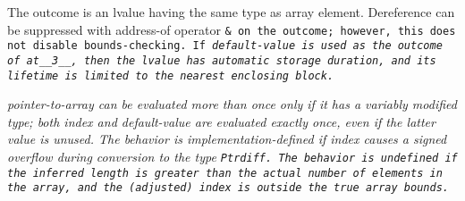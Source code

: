 The outcome is an lvalue having the same type as array element.
Dereference can be suppressed with address-of operator \tt{&}
on the outcome; however, this does not disable bounds-checking.
If \it{default-value} is used as the outcome of \tt{at__3__},
then the lvalue has automatic storage duration,
and its lifetime is limited to the nearest enclosing block.

\it{pointer-to-array} can be evaluated more than once only if
it has a variably modified type; both \it{index} and \it{default-value}
are evaluated exactly once, even if the latter value is unused.
The behavior is implementation-defined if \it{index} causes
a signed overflow during conversion to the type \tt{Ptrdiff}.
The behavior is undefined if the inferred length is
greater than the actual number of elements in the array,
and the (adjusted) index is outside the true array bounds.
